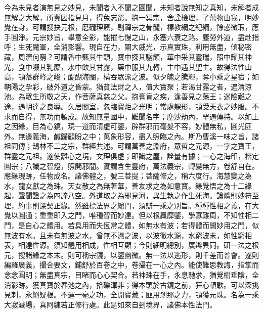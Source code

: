 今為未見者演無見之妙見，未聞者入不聞之圓聞，未知者說無知之真知，未解者成無解之大解，所冀因指見月，得兔忘罤。抱一冥宗，舍詮檢理，了萬物由我，明妙覺在身，可謂搜抉元根，磨礲理窟，剔禪宗之骨髓，標教網之紀綱，餘惑微瑕，應手圓淨。元宗妙旨，舉意全影，能摧七慢之山，永塞六衰之路。塵勞外道，盡赴指呼；生死魔軍，全消影響。現自在力，闡大威光，示真實珠，利用無盡，傾秘密藏，周濟何窮？可謂香中爇其牛頭，寶中探其驪頷，華中采其靈瑞，照中耀其神光，食中啜其乳糜，水中飲其甘露，藥中服其九轉，主中遇其聖主。故得法性山高，頓落群峰之峻；醍醐海闊，橫吞眾派之波。似夕魄之騰輝，奪小乘之星宿；如朝陽之孕彩，破外道之昏蒙。猶貧法財之人，值大寶聚；若渴甘露之者，遇清涼池。為眾生所敬之天，作菩薩真慈之父。抱膏肓之疾，逢善見之藥王；迷險難之途，遇明達之良導。久居閽室，忽臨寶炬之光明；常處躶形，頓受天衣之妙服。不求而自得，無功而頓成。故知無量國中，難聞名字；塵沙劫內，罕遇傳持。以如上之因緣，目為心鏡，現一道而清虛可鑒，辟群邪而毫髮不容，妙體無私，圓光匪外。無邊義海，鹹歸顧盼之中；萬象形容，盡入照臨之內。斯乃曹溪一味之旨，諸祖同傳；鵠林不二之宗，群經共述。可謂萬善之淵府，眾哲之元源，一字之寶王，群靈之元祖。遂使離心之境，文理俱虛；即識之塵，詮量有據；一心之海印，楷定圓宗；八識之智燈，照開邪闇。實謂含生靈府，萬法義宗，轉變無方，卷舒自在。應緣現跡，任物成名。諸佛體之，號三菩提；菩薩修之，稱六度行。海慧變之為水，龍女獻之為珠。天女散之為無著華，善友求之為如意寶。緣覺悟之為十二緣起，聲聞證之為四諦八空。外道取之為邪見河，異生執之作生死海。論體則妙符至理，約事則深契正緣。然雖標法界之總門，須辯一乘之別旨。種種性相之義，在大覺以圓通；重重即入之門，唯種智而妙達。但以根羸靡鑒，學寡難周，不知性相二門，是自心之體用。若具用而失恆常之體，如無水有波；若得體而闕妙用之門，似無波有水。且未有無波之水，曾無不濕之波，以波徹水源，水窮波末，如性窮相表，相達性源。須知體用相成，性相互顯；今則細明總別，廣辯異同。研一法之根元，搜諸緣之本末。則可稱宗鏡，以鑒幽微。無一法以逃形，則千差而普會。遂則編羅廣義，撮合要文，鋪舒於百卷之中，卷攝在一心之內。能使難思教誨，指掌而念念圓明；無盡真宗，目睹而心心契合。若神珠在手，永息馳求，猶覺樹垂陰，全消影跡。獲真寶於春池之內，拾礫渾非；得本頭於古鏡之前，狂心頓歇。可以深挑見刺，永絕疑根。不運一毫之功，全開寶藏；匪用剎那之力，頓獲元珠。名為一乘大寂滅場，真阿練若正修行處。此是如來自到境界，諸佛本性法門。


